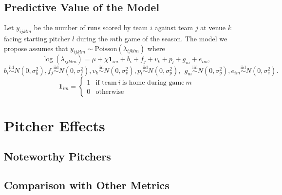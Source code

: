 \documentclass [52pt] {article}
\newcommand{\simiid}{\overset{\text{iid}}{\sim}}
\begin{document}
\subsection{Predictive Value of the Model}
Let $y_{ijklm}$ be the number of runs scored by team $i$ against team $j$ at venue $k$ facing starting pitcher $l$ during the $m$th game of the season.  The model we propose assumes that $y_{ijklm}\sim\text{Poisson}(\lambda_{ijklm})$ where
\[\log(\lambda_{ijklm}) = \mu + \chi \mathbf{1}_{im} + b_i + f_j + v_k + p_l + g_m + e_{im},\]
\[b_i\simiid N(0,\sigma^2_b), f_j\simiid N(0,\sigma^2_f), v_k\simiid N(0,\sigma^2_v), p_l\simiid N(0, \sigma^2_p),\:\:g_m\simiid N(0, \sigma^2_g), e_{im}\simiid N(0,\sigma^2_e).\]
\[\mathbf{1}_{im} = \begin{cases}
1 & \text{if team}\:i\:\text{is home during game}\:m\\
0 &\text{otherwise}
\end{cases}\]


\section{Pitcher Effects}

\subsection{Noteworthy Pitchers}

\subsection{Comparison with Other Metrics}
\end{document}
